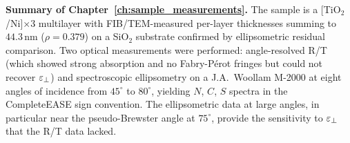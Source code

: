 \begin{resultbox}
\textbf{Summary of Chapter~\ref{ch:sample_measurements}.} The sample is a
[TiO$_2$/Ni]$\times$3 multilayer with FIB/TEM-measured per-layer thicknesses
summing to $44.3$\,nm ($\rho = 0.379$) on a SiO$_2$ substrate confirmed by
ellipsometric residual comparison. Two optical measurements were performed:
angle-resolved R/T (which showed strong absorption and no Fabry-P\'{e}rot
fringes but could not recover $\varepsilon_{\perp}$) and spectroscopic ellipsometry on a
J.A.\ Woollam M-2000 at eight angles of incidence from $45^\circ$ to
$80^\circ$, yielding $N$, $C$, $S$ spectra in the CompleteEASE sign
convention. The ellipsometric data at large angles, in particular near the
pseudo-Brewster angle at $75^\circ$, provide the sensitivity to $\varepsilon_{\perp}$
that the R/T data lacked.
\end{resultbox}
